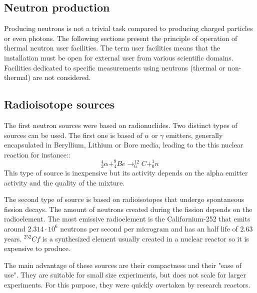 \begin{refsection}
  

  


  \section{Neutron production}
  Producing neutrons is not a trivial task compared to producing charged particles or even photons. The following sections present the principle of operation of thermal neutron user facilities. The term user facilities means that the installation must be open for external user from various scientific domains. Facilities dedicated to specific measurements using neutrons (thermal or non-thermal) are not considered.

  \subsection{Radioisotope sources}
  The first neutron sources were based on radionuclides. Two distinct types of sources can be used. The first one is based of $\alpha$ or $\gamma$ emitters, generally encapsulated in Beryllium, Lithium or Bore media, leading to the this nuclear reaction for instance::
  \begin{equation*}
    _{2}^{4}\alpha + _{4}^{9}Be \rightarrow _{6}^{12}C + _{0}^{1}n
  \end{equation*}
  This type of source is inexpensive but its activity depends on the alpha emitter activity and the quality of the mixture.
  
  The second type of source is based on radioisotopes that undergo spontaneous fission decays. The amount of neutrons created during the fission depends on the radioelement. The most emissive radioelement is the Californium-252 that emits around $2.314 \cdot 10^{6}$ neutrons per second per microgram and has an half life of $2.63$ years.
  $^{252}Cf$ is a synthesized element usually created in a nuclear reactor so it is expensive to produce.

  The main advantage of these sources are their compactness and their "ease of use". They are suitable for small size experiments, but does not scale for larger experiments. For this purpose, they were quickly overtaken by research reactors.


\end{refsection}
